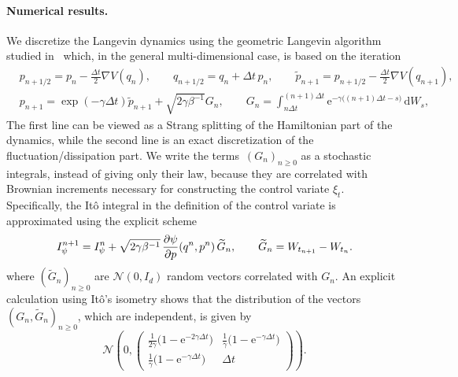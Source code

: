 \documentclass[11pt,a4paper]{article}
\newcommand{\e}{\mathrm{e}}
\newcommand{\expect}[0]{\mathbf{E}}
\newcommand{\grad}{\nabla}
\renewcommand{\d}{\mathrm d}
\theoremstyle{plain}
\numberwithin{equation}{section}
\renewcommand{\geq}{\geqslant}
\begin{document}
\paragraph{Numerical results.}%
We discretize the Langevin dynamics using the geometric Langevin algorithm studied in~\cite{MR2608370} which,
in the general multi-dimensional case, is based on the iteration
\begin{align*}
    & p_{n+1/2} = p_n - \frac{\Delta t}{2} \grad V(q_n),
    \qquad q_{n+1/2} = q_n + \Delta t \, p_n,
    \qquad \widetilde p_{n+1} = p_{n+1/2} - \frac{\Delta t}{2} \grad V(q_{n+1}), \\
    & p_{n+1} = \exp \left(- \gamma \Delta t \right) \widetilde p_{n+1}
    + \sqrt{2 \gamma \beta^{-1}} G_n, \qquad G_n = \int_{n \Delta t}^{(n+1)\Delta t} \e^{-\gamma \bigl((n+1)\Delta t-s\bigr)} \, \d W_s,
\end{align*}
The first line can be viewed as a Strang splitting of the Hamiltonian part of the dynamics,
while the second line is an exact discretization of the fluctuation/dissipation part.
We write the terms~$(G_n)_{n\geq0}$ as a stochastic integrals, instead of giving only their law,
because they are correlated with Brownian increments necessary for constructing the control variate $\xi_t$.
Specifically, the It\^o integral in the definition of the control variate is approximated using the explicit scheme
\[
    I_{\psi}^{n+1} = I_{\psi}^n + \sqrt{2 \gamma \beta^{-1}} \, \derivative{1}[\psi]{p}(q^{n}, p^{n}) \, \widetilde G_n, \qquad \widetilde G_n = W_{t_{n+1}} - W_{t_n}.
\]
where $(\widetilde G_n)_{n \geq 0}$ are $\mathcal N(0, I_d)$ random vectors correlated with $G_n$.
An explicit calculation using It\^o's isometry shows that the distribution of the vectors $(G_n, \widetilde G_n)_{n \geq 0}$,
which are independent, is given by
\[
    \mathcal N
    \left(0,
        \begin{pmatrix}
            \frac{1}{2 \gamma} \bigl(1 - \e^{-2 \gamma \Delta t}\bigr) & \frac{1}{\gamma}\bigl(1 - \e^{-\gamma \Delta t}\bigr) \\
            \frac{1}{\gamma}\bigl(1 - \e^{-\gamma \Delta t}\bigr) & \Delta t
        \end{pmatrix}
    \right).
\]

\end{document}
